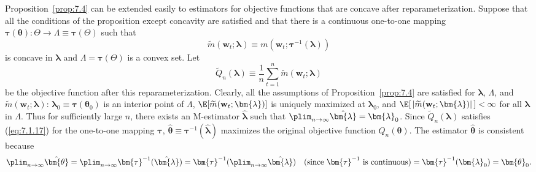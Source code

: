 Proposition~\ref{prop:7.4} can be extended easily to estimators for objective functions that are concave after reparameterization. Suppose that all the conditions of the proposition except concavity are satisfied and that there is a continuous one-to-one mapping $\bm{\tau}(\bm{\theta}) : \Theta \to \Lambda \equiv \bm{\tau}(\Theta)$ such that
\[
\widetilde{m}(\mathbf{w}_t; \bm{\lambda}) \equiv m(\mathbf{w}_t; \bm{\tau}^{-1}(\bm{\lambda}))
\]
is concave in $\bm{\lambda}$ and $\Lambda = \bm{\tau}(\Theta)$ is a convex set. Let
\[
\widetilde{Q}_n(\bm{\lambda}) \equiv \frac{1}{n} \sum_{t=1}^{n} \widetilde{m}(\mathbf{w}_t; \bm{\lambda})
\]
be the objective function after this reparameterization. Clearly, all the assumptions of Proposition~\ref{prop:7.4} are satisfied for $\bm{\lambda}$, $\Lambda$, and $\widetilde{m}(\mathbf{w}_t; \bm{\lambda})$: $\bm{\lambda}_0 \equiv \bm{\tau}(\bm{\theta}_0)$ is an interior point of $\Lambda$, $\E[\widetilde{m}(\mathbf{w}_t; \bm{\lambda})]$ is uniquely maximized at $\bm{\lambda}_0$, and $\E[\,|\widetilde{m}(\mathbf{w}_t; \bm{\lambda})|\,] < \infty$ for all $\bm{\lambda}$ in $\Lambda$. Thus for sufficiently large $n$, there exists an M-estimator $\hat{\bm{\lambda}}$ such that $\plim_{n\to\infty} \hat{\bm{\lambda}} = \bm{\lambda}_0$. Since $\widetilde{Q}_n(\bm{\lambda})$ satisfies (\ref{eq:7.1.17}) for the one-to-one mapping $\bm{\tau}$, $\hat{\bm{\theta}} \equiv \bm{\tau}^{-1}(\hat{\bm{\lambda}})$ maximizes the original objective function $Q_n(\bm{\theta})$. The estimator $\hat{\bm{\theta}}$ is consistent because
\begin{equation}
\label{eq:7.2.6}
\plim_{n\to\infty} \hat{\bm{\theta}} = \plim_{n\to\infty} \bm{\tau}^{-1}(\hat{\bm{\lambda}}) = \bm{\tau}^{-1}(\plim_{n\to\infty} \hat{\bm{\lambda}}) \quad (\text{since } \bm{\tau}^{-1} \text{ is continuous}) = \bm{\tau}^{-1}(\bm{\lambda}_0) = \bm{\theta}_0.
\end{equation}

